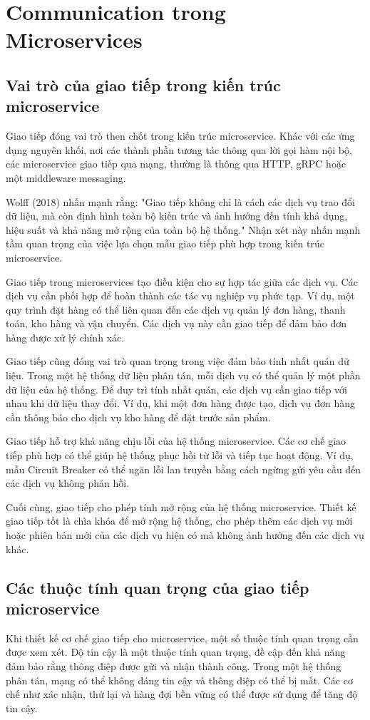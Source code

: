 \section{Communication trong Microservices}

\subsection{Vai trò của giao tiếp trong kiến trúc microservice}
Giao tiếp đóng vai trò then chốt trong kiến trúc microservice. Khác với các ứng
dụng nguyên khối, nơi các thành phần tương tác thông qua lời gọi hàm nội bộ,
các microservice giao tiếp qua mạng, thường là thông qua HTTP, gRPC hoặc một
middleware messaging.

Wolff (2018) nhấn mạnh rằng: "Giao tiếp không chỉ là cách các dịch vụ trao đổi
dữ liệu, mà còn định hình toàn bộ kiến trúc và ảnh hưởng đến tính khả dụng,
hiệu suất và khả năng mở rộng của toàn bộ hệ thống." Nhận xét này nhấn mạnh tầm
quan trọng của việc lựa chọn mẫu giao tiếp phù hợp trong kiến trúc
microservice.

Giao tiếp trong microservices tạo điều kiện cho sự hợp tác giữa các dịch vụ.
Các dịch vụ cần phối hợp để hoàn thành các tác vụ nghiệp vụ phức tạp. Ví dụ,
một quy trình đặt hàng có thể liên quan đến các dịch vụ quản lý đơn hàng, thanh
toán, kho hàng và vận chuyển. Các dịch vụ này cần giao tiếp để đảm bảo đơn hàng
được xử lý chính xác.

Giao tiếp cũng đóng vai trò quan trọng trong việc đảm bảo tính nhất quán dữ
liệu. Trong một hệ thống dữ liệu phân tán, mỗi dịch vụ có thể quản lý một phần
dữ liệu của hệ thống. Để duy trì tính nhất quán, các dịch vụ cần giao tiếp với
nhau khi dữ liệu thay đổi. Ví dụ, khi một đơn hàng được tạo, dịch vụ đơn hàng
cần thông báo cho dịch vụ kho hàng để đặt trước sản phẩm.

Giao tiếp hỗ trợ khả năng chịu lỗi của hệ thống microservice. Các cơ chế giao
tiếp phù hợp có thể giúp hệ thống phục hồi từ lỗi và tiếp tục hoạt động. Ví dụ,
mẫu Circuit Breaker có thể ngăn lỗi lan truyền bằng cách ngừng gửi yêu cầu đến
các dịch vụ không phản hồi.

Cuối cùng, giao tiếp cho phép tính mở rộng của hệ thống microservice. Thiết kế
giao tiếp tốt là chìa khóa để mở rộng hệ thống, cho phép thêm các dịch vụ mới
hoặc phiên bản mới của các dịch vụ hiện có mà không ảnh hưởng đến các dịch vụ
khác.

\subsection{Các thuộc tính quan trọng của giao tiếp microservice}
Khi thiết kế cơ chế giao tiếp cho microservice, một số thuộc tính quan trọng
cần được xem xét. Độ tin cậy là một thuộc tính quan trọng, đề cập đến khả năng
đảm bảo rằng thông điệp được gửi và nhận thành công. Trong một hệ thống phân
tán, mạng có thể không đáng tin cậy và thông điệp có thể bị mất. Các cơ chế như
xác nhận, thử lại và hàng đợi bền vững có thể được sử dụng để tăng độ tin cậy.

